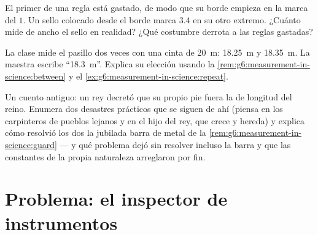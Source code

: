 \begin{exercise}[$\star\star$]\label{exo:g6:measurement-in-science:10}
El primer  de una regla está gastado, de modo que su borde
empieza en la marca del $1$. Un sello colocado desde el borde marca
$3.4$ en su otro extremo. ¿Cuánto mide de ancho el sello en realidad?
¿Qué costumbre derrota a las reglas gastadas?
\end{exercise}

\begin{exercise}[$\star\star$]\label{exo:g6:measurement-in-science:11}
La clase mide el pasillo dos veces con una cinta de \qty{20}{m}:
\qty{18.25}{m} y \qty{18.35}{m}. La maestra escribe
``\qty{18.3}{m}''. Explica su elección usando la
\cref{rem:g6:measurement-in-science:between} y el
\cref{ex:g6:measurement-in-science:repeat}.
\end{exercise}

\begin{exercise}[$\star\star\star$]\label{exo:g6:measurement-in-science:12}
Un cuento antiguo: un rey decretó que su propio pie fuera la
 de longitud del reino. Enumera dos desastres prácticos que
se siguen de ahí (piensa en los carpinteros de pueblos lejanos y en el
hijo del rey, que crece y hereda) y explica cómo resolvió los dos la
jubilada barra de metal de la
\cref{rem:g6:measurement-in-science:guard} --- y qué problema dejó sin
resolver incluso la barra y que las constantes de la propia naturaleza
arreglaron por fin.
\end{exercise}

\section{Problema: el inspector de instrumentos}


